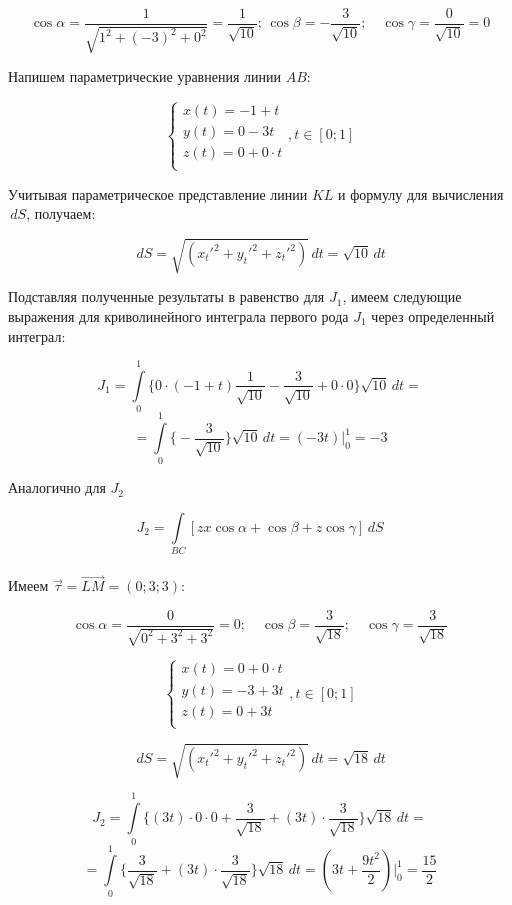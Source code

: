 \documentclass[12pt]{article}
\begin{document}
	$$ \cos{\alpha} = \frac{1}{\sqrt{ 1^2 + (-3)^2 + 0^2 }} = \frac{ 1 }{ \sqrt{ 10 } }; \, \cos\beta = - \frac{3}{\sqrt{10}};\quad \cos\gamma = \frac{0}{\sqrt{10}} = 0$$
		
	Напишем параметрические уравнения линии $ AB $:
		
	$$\begin{cases}
		x(t) =-1 +   t\\
		y(t) = 0 - 3 t \\
		z(t) = 0 + 0 \cdot t\\
	\end{cases}, t \in [0;1]$$
		
	Учитывая параметрическое представление линии $ KL $ и формулу для вычисления $ \,dS $, получаем: 
		
	$$\,dS = \sqrt{(x_t'^2 + y_t'^2 + z_t'^2 )} \,dt = \sqrt{10} \,dt$$  

	Подставляя полученные результаты в равенство для $ J_1 $, имеем следующие выражения для криволинейного интеграла первого рода $ J_1 $ через определенный интеграл:

	$$J_1 = \int \limits_{0}^1 \bigg\{  0 \cdot (- 1 + t) \frac{ 1 }{ \sqrt{ 10 } } - \frac{3}{\sqrt{10}} + 0 \cdot 0 \bigg\} \sqrt{10} \, dt = $$
	$$= \int \limits_{0}^1 \bigg\{ - \frac{3}{\sqrt{10}} \bigg\} \sqrt{10} \, dt = (-3t)\Big|_0^{1} = -3$$

	Аналогично для $ J_2 $ 

	$$J_2 = \int \limits_{BC} [ z x \cos{\alpha} + \cos{\beta} + z \cos{\gamma} ] \, dS $$\\
	Имеем $ \vec{\tau} = \vec{LM} = (0; 3; 3) $:

	$$\cos\alpha = \frac{0}{\sqrt{0^2 + 3^2 + 3^2}} = 0;\quad \cos\beta = \frac{3}{\sqrt{18}};\quad \cos\gamma = \frac{3}{\sqrt{18}}$$
		
	$$\begin{cases}
		x(t) = 0 + 0 \cdot t\\
		y(t) = -3 + 3t\\
		z(t) = 0 + 3t\\
	\end{cases}, t \in [0;1]$$
		
	$$\,dS = \sqrt{(x_t'^2 + y_t'^2 + z_t'^2 )} \,dt = \sqrt{18} \,dt$$  

	$$ J_2 = \int \limits_{0}^1 \bigg\{  (3t) \cdot 0 \cdot 0 + \frac{3}{\sqrt{18}} + (3t) \cdot \frac{3}{\sqrt{18}} \bigg\} \sqrt{18} \, dt = $$
	$$ = \int \limits_{0}^1 \bigg\{ \frac{3}{\sqrt{18}} + (3t) \cdot \frac{3}{\sqrt{18}} \bigg\} \sqrt{18} \, dt  = ( 3 t + \frac{ 9t^2 }{2} ) \Big|_0^1 = \frac{15}{2} $$
\end{document}
